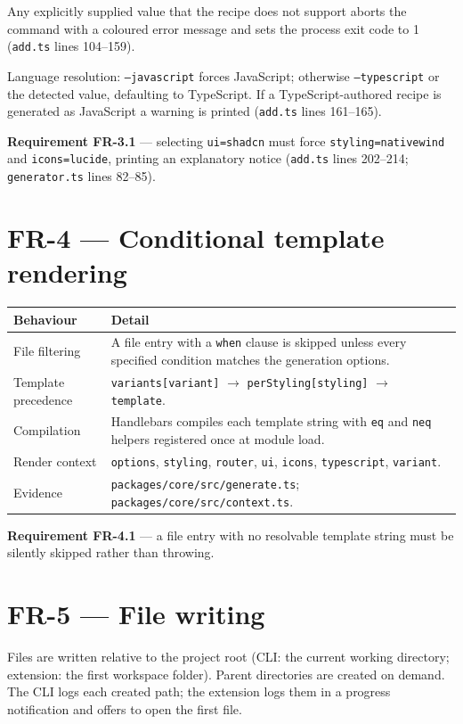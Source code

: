 Any explicitly supplied value that the recipe does not support aborts the command
with a coloured error message and sets the process exit code to 1
(\texttt{add.ts} lines 104--159).

Language resolution: \texttt{--javascript} forces JavaScript;
otherwise \texttt{--typescript} or the detected value, defaulting to
TypeScript. If a TypeScript-authored recipe is generated as JavaScript a warning
is printed (\texttt{add.ts} lines 161--165).

\textbf{Requirement FR-3.1} --- selecting \texttt{ui=shadcn} must force
\texttt{styling=nativewind} and \texttt{icons=lucide}, printing an explanatory
notice (\texttt{add.ts} lines 202--214; \texttt{generator.ts} lines 82--85).

\section{FR-4 --- Conditional template rendering}

\begin{longtable}{@{}L{4.4cm}L{9.6cm}@{}}
\toprule
\textbf{Behaviour} & \textbf{Detail} \\
\midrule
\endhead
File filtering & A file entry with a \texttt{when} clause is skipped unless every
specified condition matches the generation options. \\
Template precedence & \texttt{variants[variant]} $\rightarrow$
\texttt{perStyling[styling]} $\rightarrow$ \texttt{template}. \\
Compilation & Handlebars compiles each template string with \texttt{eq} and
\texttt{neq} helpers registered once at module load. \\
Render context & \texttt{options}, \texttt{styling}, \texttt{router}, \texttt{ui},
\texttt{icons}, \texttt{typescript}, \texttt{variant}. \\
Evidence & \texttt{packages/core/src/generate.ts};
\texttt{packages/core/src/context.ts}. \\
\bottomrule
\end{longtable}

\textbf{Requirement FR-4.1} --- a file entry with no resolvable template string
must be silently skipped rather than throwing.

\section{FR-5 --- File writing}

Files are written relative to the project root (CLI: the current working
directory; extension: the first workspace folder). Parent directories are created
on demand. The CLI logs each created path; the extension logs them in a progress
notification and offers to open the first file.

